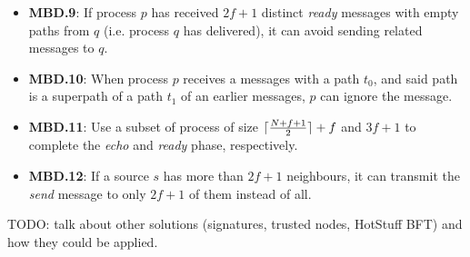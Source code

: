 \begin{itemize}
    \item \textbf{MBD.9}: If process $p$ has received $2f+1$ distinct \textit{ready} messages with empty paths from $q$ (i.e. process $q$ has delivered), it can avoid sending related messages to $q$.
    \item \textbf{MBD.10}: When process $p$ receives a messages with a path $t_0$, and said path is a superpath of a path $t_1$ of an earlier messages, $p$ can ignore the message.
    \item \textbf{MBD.11}: Use a subset of process of size $\lceil\frac{N+f+1}{2}\rceil + f$ and $3f+1$ to complete the \textit{echo} and \textit{ready} phase, respectively.
    \item \textbf{MBD.12}: If a source $s$ has more than $2f+1$ neighbours, it can transmit the \textit{send} message to only $2f+1$ of them instead of all.
\end{itemize}

TODO: talk about other solutions (signatures, trusted nodes, HotStuff BFT) and how they could be applied.
